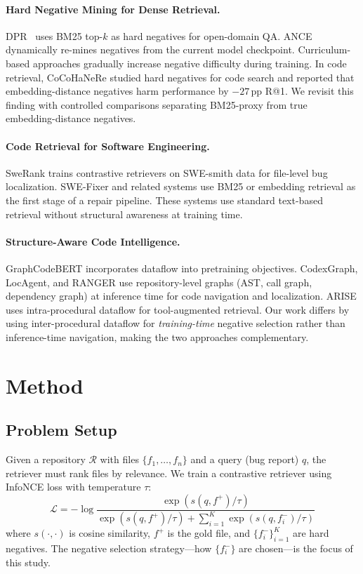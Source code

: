 \documentclass[11pt]{article}
\newcommand{\pp}{\,\text{pp}}
\begin{document}
\paragraph{Hard Negative Mining for Dense Retrieval.}
DPR~\citep{karpukhin2020dense} uses BM25 top-$k$ as hard negatives for open-domain QA.
ANCE~\citep{xiong2021approximate} dynamically re-mines negatives from the current model checkpoint.
Curriculum-based approaches gradually increase negative difficulty during training.
In code retrieval, CoCoHaNeRe studied hard negatives for code search and reported that embedding-distance negatives harm performance by $-27\pp{}$ R@1.
We revisit this finding with controlled comparisons separating BM25-proxy from true embedding-distance negatives.

\paragraph{Code Retrieval for Software Engineering.}
SweRank trains contrastive retrievers on SWE-smith data for file-level bug localization.
SWE-Fixer and related systems use BM25 or embedding retrieval as the first stage of a repair pipeline.
These systems use standard text-based retrieval without structural awareness at training time.

\paragraph{Structure-Aware Code Intelligence.}
GraphCodeBERT incorporates dataflow into pretraining objectives.
CodexGraph, LocAgent, and RANGER use repository-level graphs (AST, call graph, dependency graph) at inference time for code navigation and localization.
ARISE uses intra-procedural dataflow for tool-augmented retrieval.
Our work differs by using inter-procedural dataflow for \emph{training-time} negative selection rather than inference-time navigation, making the two approaches complementary.

\section{Method}
\label{sec:method}

\subsection{Problem Setup}

Given a repository $\mathcal{R}$ with files $\{f_1, \ldots, f_n\}$ and a query (bug report) $q$, the retriever must rank files by relevance.
We train a contrastive retriever using InfoNCE loss with temperature $\tau$:
\begin{equation}
    \mathcal{L} = -\log \frac{\exp(s(q, f^+) / \tau)}{\exp(s(q, f^+) / \tau) + \sum_{i=1}^{K} \exp(s(q, f_i^-) / \tau)}
\end{equation}
where $s(\cdot, \cdot)$ is cosine similarity, $f^+$ is the gold file, and $\{f_i^-\}_{i=1}^K$ are hard negatives.
The negative selection strategy---how $\{f_i^-\}$ are chosen---is the focus of this study.
\end{document}

